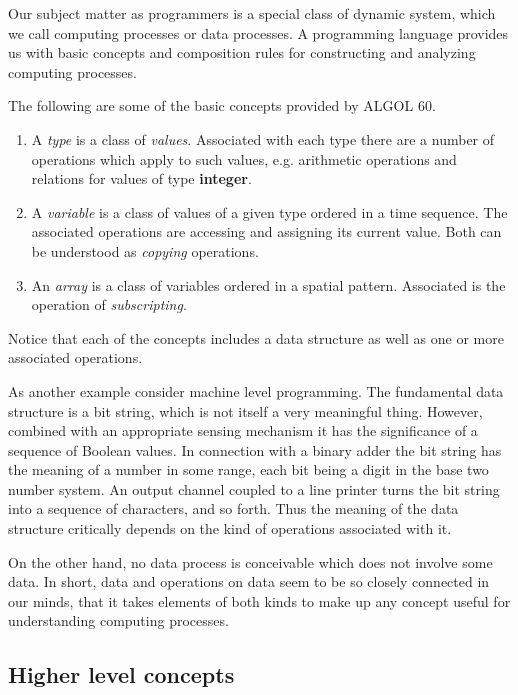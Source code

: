 Our subject matter as programmers is a special class of dynamic system, which we call computing processes or data processes. A programming language provides us with basic concepts and composition rules for constructing and analyzing computing processes.

The following are some of the basic concepts provided by ALGOL 60.

\begin{enumerate}[wide, nosep, label=(\arabic*)]
	\item A \textit{type} is a class of \textit{values}. Associated with each type there are a number of operations which apply to such values, e.g. arithmetic operations and relations for values of type \textbf{integer}.
	\item A \textit{variable} is a class of values of a given type ordered in a time sequence. The associated operations are accessing and assigning its current value. Both can be understood as \textit{copying} operations.
	\item An \textit{array} is a class of variables ordered in a spatial pattern. Associated is the operation of \textit{subscripting}.
\end{enumerate}

Notice that each of the concepts includes a data structure as well as one or more associated operations.

As another example consider machine level programming. The fundamental data structure is a bit string, which is not itself a very meaningful thing. However, combined with an appropriate sensing mechanism it has the significance of a sequence of Boolean values. In connection with a binary adder the bit string has the meaning of a number in some range, each bit being a digit in the base two number system. An output channel coupled to a line printer turns the bit string into a sequence of characters, and so forth. Thus the meaning of the data structure critically depends on the kind of operations associated with it.

On the other hand, no data process is conceivable which does not involve some data. In short, data and operations on data seem to be so closely connected in our minds, that it takes elements of both kinds to make up any concept useful for understanding computing processes.

\subsection{Higher level concepts}

